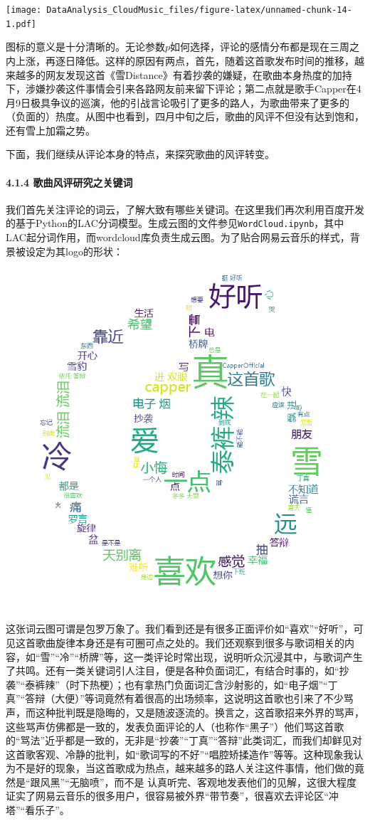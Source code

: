 \documentclass[
]{article}
\begin{document}
\texttt{[image: DataAnalysis\_CloudMusic\_files/figure-latex/unnamed-chunk-14-1.pdf]}

图标的意义是十分清晰的。无论参数\(p\)如何选择，评论的感情分布都是现在三周之内上涨，再逐日降低。这样的原因有两点，首先，随着这首歌发布时间的推移，越来越多的网友发现这首《雪Distance》有着抄袭的嫌疑，在歌曲本身热度的加持下，涉嫌抄袭这件事情会引来各路网友前来留下评论；第二点就是歌手Capper在4月9日极具争议的巡演，他的引战言论吸引了更多的路人，为歌曲带来了更多的（负面的）热度。从图中也看到，四月中旬之后，歌曲的风评不但没有达到饱和，还有雪上加霜之势。

下面，我们继续从评论本身的特点，来探究歌曲的风评转变。

\hypertarget{ux6b4cux66f2ux98ceux8bc4ux7814ux7a76ux4e4bux5173ux952eux8bcd}{%
\paragraph{4.1.4
歌曲风评研究之关键词}\label{ux6b4cux66f2ux98ceux8bc4ux7814ux7a76ux4e4bux5173ux952eux8bcd}}

我们首先关注评论的词云，了解大致有哪些关键词。在这里我们再次利用百度开发的基于Python的LAC分词模型。生成云图的文件参见\texttt{WordCloud.ipynb}，其中LAC起分词作用，而wordcloud库负责生成云图。为了贴合网易云音乐的样式，背景被设定为其logo的形状：

\begin{center}\includegraphics[width=0.5\linewidth,height=0.5\textheight]{img/1} \end{center}

这张词云图可谓是包罗万象了。我们看到还是有很多正面评价如``喜欢''``好听''，可见这首歌曲旋律本身还是有可圈可点之处的。我们还观察到很多与歌词相关的内容，如``雪''``冷''``桥牌''等，这一类评论时常出现，说明听众沉浸其中，与歌词产生了共鸣。还有一类关键词引人注目，便是各种负面词汇，有结合时事的，如``抄袭''``泰裤辣''（时下热梗）；也有拿热门负面词汇含沙射影的，如``电子烟''``丁真''``答辩（大便）''等词竟然有着很高的出场频率，这说明这首歌也引来了不少骂声，而这种批判既是隐晦的，又是随波逐流的。换言之，这首歌招来外界的骂声，这些骂声仿佛都是一致的，发表负面评论的人（也称作``黑子''）他们骂这首歌的``骂法''近乎都是一致的，无非是``抄袭''``丁真''``答辩''此类词汇，而我们却鲜见对这首歌客观、冷静的批判，如``歌词写的不好''``唱腔矫揉造作''等等。这种现象我认为不是好的现象，当这首歌成为热点，越来越多的路人关注这件事情，他们做的竟然是``跟风黑''``无脑喷''，而不是
认真听完、客观地发表他们的见解，这很大程度证实了网易云音乐的很多用户，很容易被外界``带节奏''，很喜欢去评论区``冲塔''``看乐子''。
\end{document}
